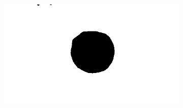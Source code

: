 \documentclass{article}
\begin{document}
\begin{figure}[H]
\begin{subfigure}{.35\textwidth}
  \centering
  \includegraphics[width=0.97\linewidth]{_Figures/raw_data_1_cond_dilation.png}
  \caption{}
  \label{fig:raw_1_closure}
\end{subfigure}


\end{figure}
\end{document}
